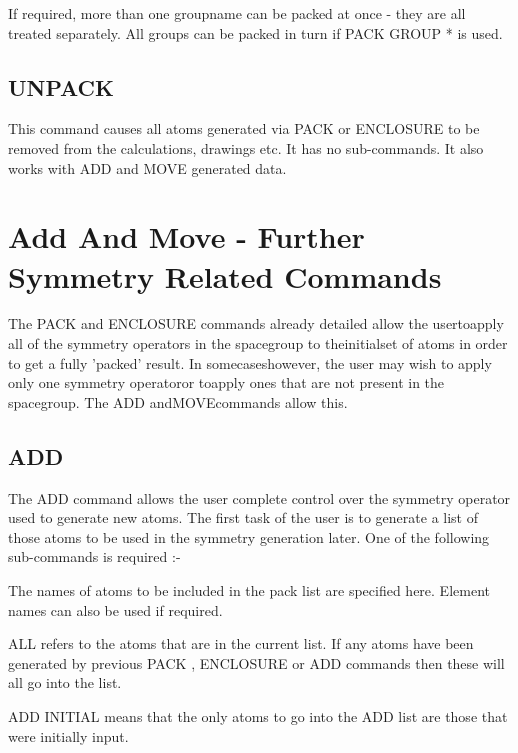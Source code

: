 \documentclass[10pt,a4paper]{report}
\begin{document}
If required, more than one groupname can be packed at once - they are
all treated separately. All groups can be packed in turn if PACK GROUP *
is used.



\section{UNPACK}


This command causes all atoms generated via PACK or ENCLOSURE
to be
removed from the calculations, drawings etc. It has no
sub-commands.
It also works with ADD and MOVE generated data.



\chapter{Add And Move - Further Symmetry Related Commands}

The PACK and ENCLOSURE commands already detailed allow the usertoapply all of the symmetry operators in the spacegroup to theinitialset of atoms in order to get a fully 'packed' result. In somecaseshowever, the user may wish to apply only one symmetry operatoror toapply ones that are not present in the spacegroup. The ADD andMOVEcommands allow this.\section{ADD}


The ADD command allows the user complete control over the
symmetry
operator used to generate new atoms. The first task of the user
is to
generate a list of those atoms to be used in the symmetry
generation
later. One of the following sub-commands is required :-


\bigskip{}


The names of atoms to be included in the pack list are specified
here.
Element names can also be used if required.


\bigskip{}


ALL refers to the atoms that are in the current list. If any
atoms
have been generated by previous PACK , ENCLOSURE or ADD commands
then
these will all go into the list.


\bigskip{}


ADD INITIAL means that the only atoms to go into the ADD list are
those
that were initially input.
\end{document}
